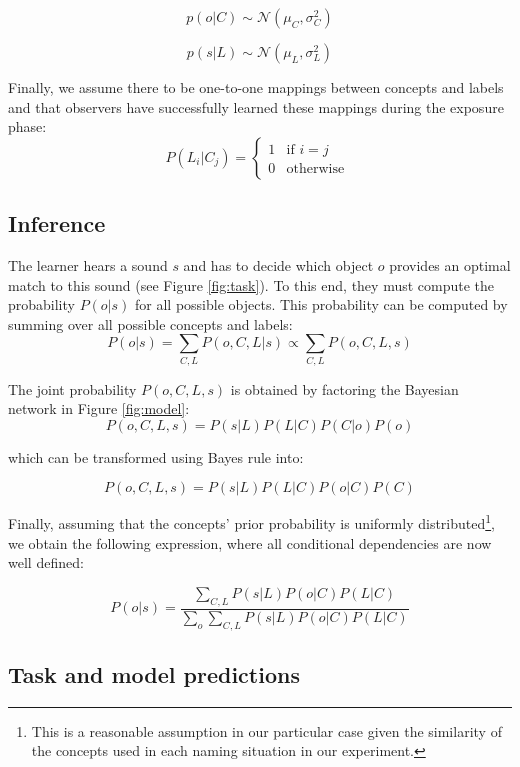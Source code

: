 \documentclass[english,,man,floatsintext]{apa6}
\let\rmarkdownfootnote\footnote%
\def\footnote{\protect\rmarkdownfootnote}
\theoremstyle{definition}
\theoremstyle{definition}
\theoremstyle{definition}
\theoremstyle{remark}
\begin{document}
\[ p(o | C) \sim  \mathcal{N}(\mu_C, \sigma^2_C) \]

\[ p(s| L) \sim  \mathcal{N}(\mu_L, \sigma^2_L) \]

Finally, we assume there to be one-to-one mappings between concepts and
labels and that observers have successfully learned these mappings
during the exposure phase: \[
P(L_i|C_j) = 
\begin{cases}
  1 & \text{if  }  i=j \\  
  0  & \text{otherwise  }
\end{cases}
\]

\subsection{Inference}\label{inference}

The learner hears a sound \(s\) and has to decide which object \(o\)
provides an optimal match to this sound (see Figure \ref{fig:task}). To
this end, they must compute the probability \(P(o|s)\) for all possible
objects. This probability can be computed by summing over all possible
concepts and labels:
\[P(o|s)=\sum_{C,L} P(o, C, L| s) \propto \sum_{C,L} P(o, C, L, s) \]

The joint probability \(P(o, C, L, s)\) is obtained by factoring the
Bayesian network in Figure \ref{fig:model}:
\[P(o,C,L,s) = P(s|L)P(L|C)P(C|o)P(o) \]

which can be transformed using Bayes rule into:

\[P(o,C,L,s) = P(s|L)P(L|C)P(o|C)P(C) \]

Finally, assuming that the concepts' prior probability is uniformly
distributed\footnote{This is a reasonable assumption in our particular case given the similarity of the concepts used in each naming situation in our experiment.},
we obtain the following expression, where all conditional dependencies
are now well defined:

\[
P(o|s) = \frac{\sum_{C,L} P(s|L)P(o|C)P(L|C)}{\sum_{o} \sum_{C,L} P(s|L)P(o|C)P(L|C)}
\]

\subsection{Task and model
predictions}\label{task-and-model-predictions}
\end{document}
